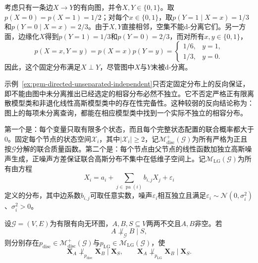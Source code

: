 \begin{example}[未分离但独立的固定分布]
  \label{ex:pgm-directed-unseparated-independent}
  考虑只有一条边$X\to Y$的有向图，并令$X,Y\in\{0,1\}$。取$p(X=0)=p(X=1)=1/2$；对每个$x\in\{0,1\}$，取$p(Y=1\mid X=x)=1/3$和$p(Y=0\mid X=x)=2/3$。由于$X,Y$直接相邻，空集不能d-分离它们。另一方面，边缘化$X$得到$p(Y=1)=1/3$和$p(Y=0)=2/3$，而对所有$x,y\in\{0,1\}$，
  \[
    p(X=x,Y=y)
    =
    p(X=x)p(Y=y)
    =
    \begin{cases}
      1/6,&y=1,\\
      1/3,&y=0.
    \end{cases}
  \]
  因此，这个固定分布满足$X\perp Y$，尽管图中$X$与$Y$未被d-分离。
\end{example}

示例~\ref{ex:pgm-directed-unseparated-independent}只否定固定分布上的反向保证，即不能由图中未分离推出已经选定的相容分布必然不独立。它不否定严格正有限离散模型类和非退化线性高斯模型类中的存在性完备性。这种较弱的反向结论称为：图上的每项未分离查询，都能在相应模型类中找到一个实际不独立的相容分布。

第一个是：每个变量只取有限多个状态，而且每个完整状态配置的联合概率都大于$0$。固定每个节点的状态空间$\mathcal{X}_i$，其中$|\mathcal{X}_i|\geq2$，记$\mathcal{M}_{\mathrm{disc}}^{+}(\mathcal{G})$为所有严格为正且按$\mathcal{G}$分解的联合质量函数。第二个是：每个节点由父节点的线性函数加独立高斯噪声生成，正噪声方差保证联合高斯分布不集中在低维子空间上。记$\mathcal{M}_{\mathrm{LG}}(\mathcal{G})$为所有由方程
\[
  X_i=a_i+\sum_{j\in\operatorname{pa}(i)}b_{i,j}X_j+\varepsilon_i
\]
定义的分布，其中边系数$b_{i,j}$可取任意实数，噪声$\varepsilon_i$相互独立且满足$\varepsilon_i\sim\mathcal{N}(0,\sigma_i^2)$、$\sigma_i^2>0$。

\begin{theorem}[d-分离在特定模型类中的完备性]
  \label{thm:pgm-directed-completeness}
  设$\mathcal{G}=(V,E)$为有限有向无环图，$A,B,S\subseteq V$两两不交且$A,B$非空。若
  \[
    A\not\perp_{\mathcal{G}}B\mid S,
  \]
  则分别存在$p_{\mathrm{disc}}\in\mathcal{M}_{\mathrm{disc}}^{+}(\mathcal{G})$与$p_{\mathrm{LG}}\in\mathcal{M}_{\mathrm{LG}}(\mathcal{G})$，使
  \begin{equation}
    \bm{X}_A\not\perp_{p_{\mathrm{disc}}}\bm{X}_B\mid\bm{X}_S,
    \qquad
    \bm{X}_A\not\perp_{p_{\mathrm{LG}}}\bm{X}_B\mid\bm{X}_S.
    \label{eq:pgm-directed-completeness}
  \end{equation}
\end{theorem}

